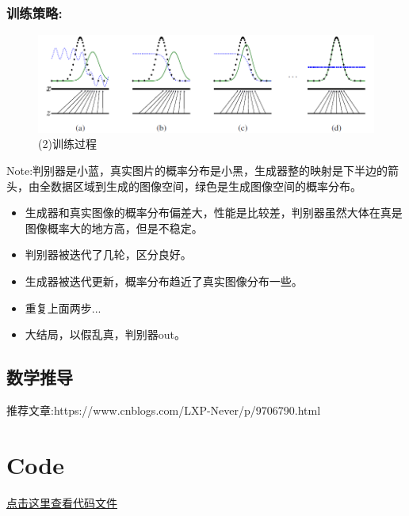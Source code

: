 \documentclass[]{report}
\begin{document}
\subsubsection{训练策略:}
\begin{figure}[hb]
	\centering
	\includegraphics[width=0.7\linewidth]{screenshot002}
	\caption{(2)训练过程}
	\label{fig:screenshot002}
\end{figure}
\indent Note:判别器是小蓝，真实图片的概率分布是小黑，生成器整的映射是下半边的箭头，由全数据区域到生成的图像空间，绿色是生成图像空间的概率分布。
\begin{itemize}
	\item 生成器和真实图像的概率分布偏差大，性能是比较差，判别器虽然大体在真是图像概率大的地方高，但是不稳定。
	\item 判别器被迭代了几轮，区分良好。
	\item 生成器被迭代更新，概率分布趋近了真实图像分布一些。
	\item 重复上面两步...
	\item 大结局，以假乱真，判别器out。
\end{itemize}
\subsection{数学推导}
推荐文章:https://www.cnblogs.com/LXP-Never/p/9706790.html
\section{Code}
\href{run:GAN.ipynb}{点击这里查看代码文件}
\end{document}
